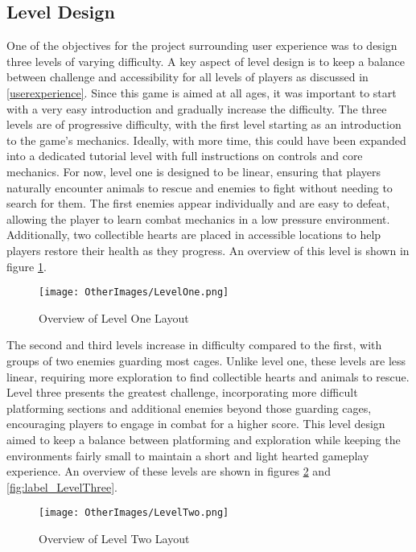 \documentclass[10pt]{final_report}
\begin{document}
\subsection{Level Design}\label{leveldesign}
One of the objectives for the project surrounding user experience was to design three levels of varying difficulty. A key aspect of level design is to keep a balance between challenge and accessibility for all levels of players as discussed in \ref{userexperience}. Since this game is aimed at all ages, it was important to start with a very easy introduction and gradually increase the difficulty. The three levels are of progressive difficulty, with the first level starting as an introduction to the game’s mechanics. Ideally, with more time, this could have been expanded into a dedicated tutorial level with full instructions on controls and core mechanics. For now, level one is designed to be linear, ensuring that players naturally encounter animals to rescue and enemies to fight without needing to search for them. The first enemies appear individually and are easy to defeat, allowing the player to learn combat mechanics in a low pressure environment. Additionally, two collectible hearts are placed in accessible locations to help players restore their health as they progress. An overview of this level is shown in figure \ref{fig:label_LevelOne}.

\begin{figure}[H]
    \centering
    \texttt{[image: OtherImages/LevelOne.png]}
    \caption{Overview of Level One Layout}
    \label{fig:label_LevelOne}
\end{figure}

The second and third levels increase in difficulty compared to the first, with groups of two enemies guarding most cages. Unlike level one, these levels are less linear, requiring more exploration to find collectible hearts and animals to rescue. Level three presents the greatest challenge, incorporating more difficult platforming sections and additional enemies beyond those guarding cages, encouraging players to engage in combat for a higher score. This level design aimed to keep a balance between platforming and exploration while keeping the environments fairly small to maintain a short and light hearted gameplay experience. An overview of these levels are shown in figures \ref{fig:label_LevelTwo} and \ref{fig:label_LevelThree}. \newline

\begin{figure}[H]
    \centering
    \texttt{[image: OtherImages/LevelTwo.png]}
    \caption{Overview of Level Two Layout}
    \label{fig:label_LevelTwo}
\end{figure}
\end{document}
